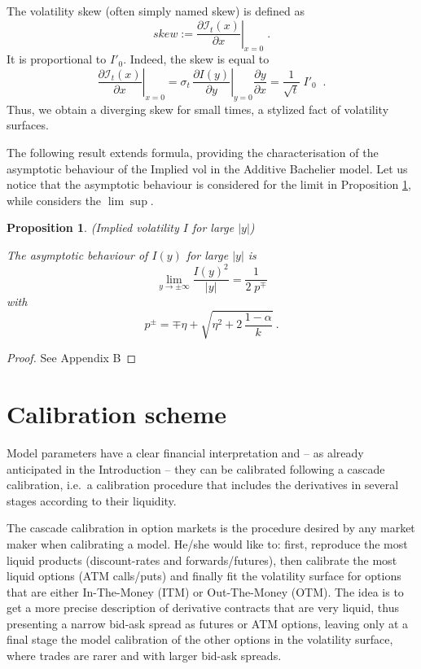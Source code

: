 \documentclass[12pt]{article}
\newtheorem{proposition}[theorem]{Proposition}
\theoremstyle{definition}
\theoremstyle{remark}
\numberwithin{theorem}{section}
\numberwithin{proposition}{section}
\numberwithin{lemma}{section}
\numberwithin{corollary}{section}
\numberwithin{definition}{section}
\numberwithin{remark}{section}
\numberwithin{example}{section}
\newcommand{\E}{\mathbb{E}}
\begin{document}
\smallskip
 
The volatility skew (often simply named skew) is defined as \citep[see, e.g.,][]{gatheral2011volatility}
\[
skew := \left. \frac{\partial  \mathcal{I}_t (x) }{\partial x} \right|_{x=0} \; .
\]
It is proportional to $I'_0$. Indeed, the skew is equal to
\begin{equation}
    \left. \frac{\partial  \mathcal{I}_t (x) }{\partial x}  \right|_{x=0} = 
\sigma_t \, \left. \frac{\partial {{I}} (y) }{\partial y} \right|_{y=0} \frac{\partial y}{\partial x} = \frac{1}{\sqrt{t}} \; I'_0 \;\; .
\label{eq:modelSkew}
\end{equation}
Thus, we obtain a diverging skew for small times, a stylized fact of volatility surfaces.

\bigskip

The following result extends \cite{lee2004moment} formula, providing the characterisation of the asymptotic behaviour of the Implied vol in the Additive Bachelier model. Let us notice that the asymptotic behaviour is considered for the limit in Proposition \ref{pr:Moment}, while \cite{lee2004moment} considers the $\lim\sup$.
\begin{proposition} {\rm  (Implied volatility  ${ I}$  for large ${|y|}$) }
\label{pr:Moment}

The asymptotic behaviour of ${ I}({ y})$ for large $|{y}|$ is
\[
\lim_{{ y} \to \pm \infty} \frac{{ I}({ y})^2}{|{ y}|} =  \frac{1}{2 \; p^\mp} 
\]
with 
\[
p^\pm =  \mp \eta + \sqrt{ {\eta}^2 + 2 \, \frac{1-\alpha}{k}  }  \: .
\]
\end{proposition}
\begin{proof}
    See Appendix B
\end{proof}

\section{Calibration scheme}
\label{sec:Calibration}

Model parameters have a clear financial interpretation and -- as already anticipated in the Introduction --
they can be calibrated following a cascade calibration, i.e.\ a calibration procedure that includes the derivatives in several stages according to their liquidity.

The cascade calibration in option markets is the procedure desired by any market maker when calibrating a model.
He/she would like to: first, reproduce the most liquid products %
(discount-rates and forwards/futures), then calibrate the most liquid options 
(ATM calls/puts) and finally fit the volatility surface for options that are either In-The-Money (ITM) or Out-The-Money (OTM).  
The idea is to get a more precise description of derivative contracts that are very liquid, thus presenting a narrow bid-ask spread
as futures or ATM options, leaving only at a final stage 
the model calibration of the other options in the volatility surface, 
where trades are rarer and with larger bid-ask spreads.
\end{document}
